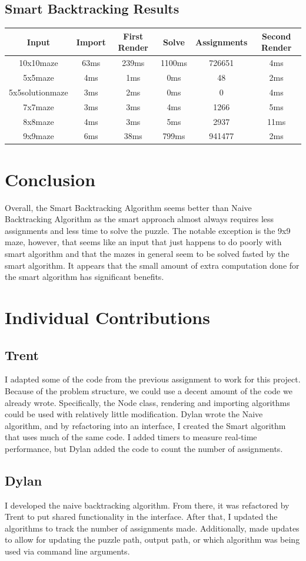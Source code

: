 \documentclass{article}
\begin{document}
\subsection{Smart Backtracking Results}
    \begin{tabular}{c c c c c c}
        Input & Import & First Render & Solve & Assignments & Second Render \\
        \hline
        10x10maze & 63ms & 239ms & 1100ms & 726651 & 4ms \\
        5x5maze & 4ms & 1ms & 0ms & 48 & 2ms \\
        5x5solutionmaze & 3ms & 2ms & 0ms & 0 & 4ms \\
        7x7maze & 3ms & 3ms & 4ms & 1266 & 5ms \\
        8x8maze & 4ms & 3ms & 5ms & 2937 & 11ms \\
        9x9maze & 6ms & 38ms & 799ms & 941477 & 2ms \\
    \end{tabular}

\section{Conclusion}
Overall, the Smart Backtracking Algorithm seems better than Naive Backtracking Algorithm as the smart approach almost always requires less assignments and less time to solve the puzzle. The notable exception is the 9x9 maze, however, that seems like an input that just happens to do poorly with smart algorithm and that the mazes in general seem to be solved fasted by the smart algorithm. It appears that the small amount of extra computation done for the smart algorithm has significant benefits.

\section{Individual Contributions}
    \subsection{Trent}
        I adapted some of the code from the previous assignment to work for this project. Because of the problem structure, we could use a decent amount of the code we already wrote. Specifically, the Node class, rendering and importing algorithms could be used with relatively little modification. Dylan wrote the Naive algorithm, and by refactoring into an interface, I created the Smart algorithm that uses much of the same code. I added timers to measure real-time performance, but Dylan added the code to count the number of assignments.
        
    \subsection{Dylan}
        I developed the naive backtracking algorithm. From there, it was refactored by Trent to put shared functionality in the interface. After that, I updated the algorithms to track the number of assignments made. Additionally, made updates to allow for updating the puzzle path, output path, or which algorithm was being used via command line arguments.
\end{document}
